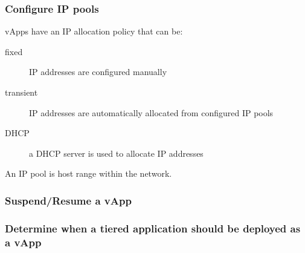 \subsubsection{Configure IP pools}

vApps have an IP allocation policy that can be:

\begin{description}

\item[fixed]
IP addresses are configured manually

\item[transient]
IP addresses are automatically allocated from configured IP pools

\item[DHCP]
a DHCP server is used to allocate IP addresses

\end{description}

An IP pool is host range within the network.

\subsubsection{Suspend/Resume a vApp}

\subsubsection{Determine when a tiered application should be deployed as a vApp}
